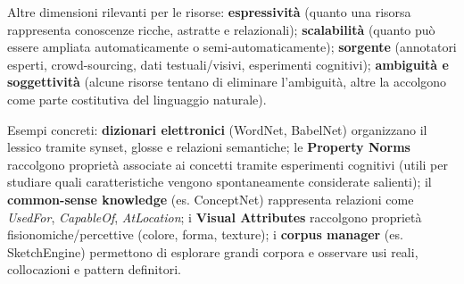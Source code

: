 \documentclass[12pt,a4paper]{article}
\begin{document}
Altre dimensioni rilevanti per le risorse: \textbf{espressivit\`a} (quanto una risorsa rappresenta conoscenze ricche, astratte e relazionali); \textbf{scalabilit\`a} (quanto pu\`o essere ampliata automaticamente o semi-automaticamente); \textbf{sorgente} (annotatori esperti, crowd-sourcing, dati testuali/visivi, esperimenti cognitivi); \textbf{ambiguit\`a e soggettivit\`a} (alcune risorse tentano di eliminare l'ambiguit\`a, altre la accolgono come parte costitutiva del linguaggio naturale).

\begin{resultbox}
\begin{center}
\end{center}
\end{resultbox}

Esempi concreti: \textbf{dizionari elettronici} (WordNet, BabelNet) organizzano il lessico tramite synset, glosse e relazioni semantiche; le \textbf{Property Norms} raccolgono propriet\`a associate ai concetti tramite esperimenti cognitivi (utili per studiare quali caratteristiche vengono spontaneamente considerate salienti); il \textbf{common-sense knowledge} (es. ConceptNet) rappresenta relazioni come \textit{UsedFor}, \textit{CapableOf}, \textit{AtLocation}; i \textbf{Visual Attributes} raccolgono propriet\`a fisionomiche/percettive (colore, forma, texture); i \textbf{corpus manager} (es. SketchEngine) permettono di esplorare grandi corpora e osservare usi reali, collocazioni e pattern definitori.
\end{document}
